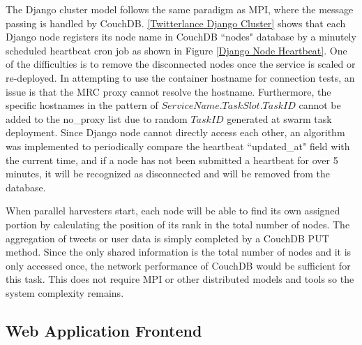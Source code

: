 The Django cluster model follows the same paradigm as MPI, where the message passing is handled by CouchDB. \ref{Twitterlance Django Cluster} shows that each Django node registers its node name in CouchDB ``nodes" database by a minutely scheduled heartbeat cron job as shown in Figure \ref{Django Node Heartbeat}. One of the difficulties is to remove the disconnected nodes once the service is scaled or re-deployed. In attempting to use the container hostname for connection tests, an issue is that the MRC proxy cannot resolve the hostname. Furthermore, the specific hostnames in the pattern of $ServiceName.TaskSlot.TaskID$ cannot be added to the no\_proxy list due to random $Task ID$ generated at swarm task deployment. Since Django node cannot directly access each other, an algorithm was implemented to periodically compare the heartbeat ``updated\_at" field with the current time, and if a node has not been submitted a heartbeat for over 5 minutes, it will be recognized as disconnected and will be removed from the database. 

When parallel harvesters start, each node will be able to find its own assigned portion by calculating the position of its rank in the total number of nodes. The aggregation of tweets or user data is simply completed by a CouchDB PUT method. Since the only shared information is the total number of nodes and it is only accessed once, the network performance of CouchDB would be sufficient for this task. This does not require MPI or other distributed models and tools so the system complexity remains. 


\subsection{Web Application Frontend}

